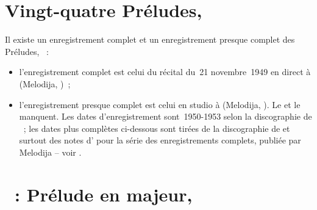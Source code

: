\begin{workitemize}
 \item{}
 \begin{perfitemize}
  \item{}
  \item{}
 \end{perfitemize}
 \item{}
 \begin{perfitemize}
  \item{}
  \item{}
 \end{perfitemize}
\end{workitemize}

\section*{%
Vingt-quatre Préludes, }

Il existe un enregistrement complet et un enregistrement presque complet des
Préludes, ~:
\begin{itemize}
 \item
 l'enregistrement complet est celui du récital du~21 novembre~1949 en direct
 à \MCGH (Melodija, )~;
 \item
 l'enregistrement presque complet est celui en studio à \Moscow (Melodija,
 ).
 Le  et le  manquent.
 Les dates d'enregistrement sont~1950-1953 selon la discographie de
 \FMalik{} \citep[voir][p.~66]{Malik}~; les dates plus complètes ci-dessous
 sont tirées de la discographie de \citet{Masuda} et surtout des notes
 d'\INikonovich{} pour la série des enregistrements complets, publiée par
 Melodija -- voir \citet[vol.~9]{Nikonovich79}.
\end{itemize}

\section{\ifChrono \Chopin{}~: \fi
Prélude  en \kC majeur,  }
\label{\thesection}

